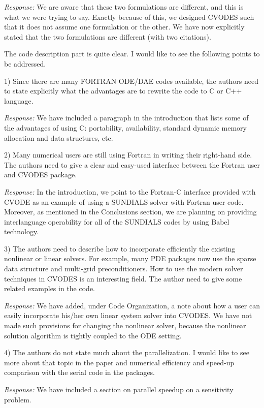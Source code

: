 {\em Response:}
We are aware that these two formulations are different, and this is
what we were trying to say. Exactly because of this, we designed
CVODES such that it does not assume one formulation or the other.  We
have now explicitly stated that the two formulations are different
(with two citations).

The code description part is quite clear. I would like to see
the following points to be addressed. 

1) Since there are many FORTRAN ODE/DAE codes available, the authors need to 
state explicitly what the advantages are to rewrite the code to C or C++
language. 

{\em Response:}
We have included a paragraph in the introduction that lists
some of the advantages of using C: portability, availability, standard
dynamic memory allocation and data structures, etc.

2) Many numerical users are still using Fortran in writing their right-hand 
side. The authors need to give a clear and easy-used interface between the 
Fortran user and CVODES package. 

{\em Response:}
In the introduction, we point to the Fortran-C interface provided
with CVODE as an example of using a SUNDIALS solver with Fortran user code.
Moreover, as mentioned in the Conclusions section, we are planning on
providing interlanguage operability for all of the SUNDIALS codes by using
Babel technology.

3) The authors need to describe how to incorporate efficiently the existing 
nonlinear or linear solvers. For example, many PDE packages now use the sparse 
data structure and multi-grid preconditioners. How to use the modern solver
techniques  in CVODES is an interesting field. The author need
to give some related examples in the code. 

{\em Response:}
We have added, under Code Organization, a note about how a user can
easily incorporate his/her own linear system solver into CVODES.  We
have not made such provisions for changing the nonlinear solver, because 
the nonlinear solution algorithm is tightly coupled to the ODE setting.

4) The authors do not state much about the parallelization. I would like to 
see more about that topic in the paper and numerical efficiency and speed-up
comparison with the serial code in the packages.

{\em Response:}
We have included a section on parallel speedup on a sensitivity problem.


